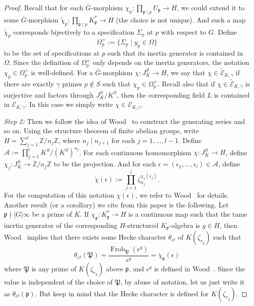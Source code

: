 \documentclass{amsart}
\numberwithin{equation}{section}
\theoremstyle{plain}
\theoremstyle{definition}
\theoremstyle{remark}
\begin{document}
\begin{proof}
	Recall that for each $\bar{G}$-morphism $\chi_p:\prod_{\mathfrak{p}\mid p}U_{\mathfrak{p}}\to H$, we could extend it to some $\bar{G}$-morphism $\tilde{\chi}_p:\prod_{\mathfrak{p}\mid p}K_{\mathfrak{p}}^*\to H$ (the choice is not unique).
	And such a map $\tilde{\chi}_p$ corresponds bijectively to a specification $\Sigma_p$ at $p$ with respect to $G$.
	Define
	\begin{equation*}
		\Omega_p^+:=\{\Sigma_p\mid y_p\in\Omega\}
	\end{equation*}
	to be the set of specifications at $p$ such that its inertia generator is contained in $\Omega$.
	Since the definition of $\Omega_p^+$ only depends on the inertia generators, the notation $\chi_p\in\Omega_p^+$ is well-defined.
	For a $\bar{G}$-morphism $\chi:J_K^S\to H$, we say that $\chi\in\tilde{\mathcal{E}}_{K,\gamma}$ if there are exactly $\gamma$ primes $p\notin S$ such that $\chi_p\in\Omega_p^+$.
	Recall also that if $\chi\in\tilde{\mathcal{E}}_{K,\gamma}$ is surjective and factors through $J_K^S/K^S$, then the corresponding field $L$ is contained in $\mathcal{E}_{K,\gamma}$.
	In this case we simply write $\chi\in\mathcal{E}_{K,\gamma}$.
	
	\emph{Step 2:}
	Then we follow the idea of Wood~\cite{wood2010probabilities} to construct the generating series and so on.
	Using the structure theorem of finite abelian groups, write $H=\sum_{j=1}^l\mathbb{Z}/n_j\mathbb{Z}$, where $n_j\mid n_{j+1}$ for each $j=1,\dots,l-1$.
	Define $\mathcal{A}:=\prod_{j=1}^l K^S/(K^S)^{n_j}$.
	For each continuous homomorphism $\chi:J_K^S\to H$, define $\chi_j:J_K^S\to\mathbb{Z}/n_j\mathbb{Z}$ to be the projection.
	And for each $\epsilon=(\epsilon_1,\dots,\epsilon_l)\in\mathcal{A}$, define
	\begin{equation*}
		\dot{\chi}(\epsilon):=\prod_{j=1}^{l}\zeta_{n_j}^{\chi_j(\epsilon_j)}.
	\end{equation*}
	For the computation of this notation $\dot{\chi}(\epsilon)$, we refer to Wood~\cite[Lemma 2.16 and 2.17]{wood2010probabilities} for details.
    Another result (or a corollary) we cite from this paper is the following.
    Let $\mathfrak{p}\nmid\lvert G\rvert\infty$ be a prime of $K$.
    If $\chi_{\mathfrak{p}}:K_{\mathfrak{p}}^*\to H$ is a continuous map such that the tame inertia generator of the corresponding $H$-structured $K_{\mathfrak{p}}$-algebra is $g\in H$, then Wood~\cite[Lemma 2.17]{wood2010probabilities} implies that there exists some Hecke character $\theta_{\epsilon^g}$ of $K(\zeta_{r_g})$ such that
    \begin{equation*}
    	\theta_{\epsilon^g}(\mathfrak{P})=\frac{\operatorname{Frob}_{\mathfrak{P}}(\epsilon^g)}{\epsilon^g}=\dot{\chi}_{\mathfrak{p}}(\epsilon)
    \end{equation*}
    where $\mathfrak{P}$ is any prime of $K(\zeta_{r_g})$ above $\mathfrak{p}$, and $\epsilon^g$ is defined in Wood~\cite[Lemma 2.17]{wood2010probabilities}.
    Since the value is independent of the choice of $\mathfrak{P}$, by abuse of notation, let us just write it as $\theta_{\epsilon^g}(\mathfrak{p})$.
    But keep in mind that the Hecke character is defined for $K(\zeta_{r_g})$.
    

\end{proof}
\end{document}
